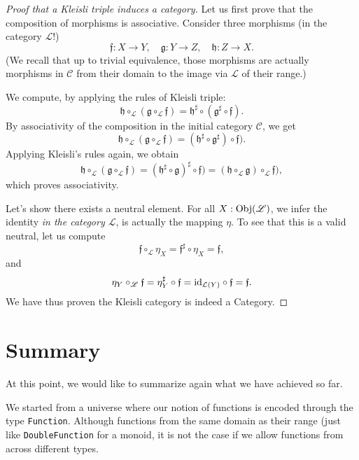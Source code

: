 \documentclass[12pt,a4paper]{report}
\theoremstyle{theorem}
\theoremstyle{definition}
\begin{document}
\begin{proof}[Proof that a Kleisli triple induces a category]
Let us first prove that the composition of morphisms is associative.
Consider three morphisms (in the category $\mathscr{L}$!)
	\[ \mathfrak{f} : X\to Y,
		\quad \mathfrak{g} : Y\to Z,
		\quad \mathfrak{h} : Z\to X .\]
(We recall that up to trivial equivalence, those morphisms are actually
morphisms in $\mathcal{C}$ from their domain to the image via $\mathcal{L}$
of their range.)

We compute, by applying the rules of Kleisli triple:
	\[ \mathfrak{h}\circ_{\mathscr{L}}
		(\mathfrak{g}\circ_{\mathscr{L}} \mathfrak{f})
	= \mathfrak{h}^\sharp \circ (\mathfrak{g}^\sharp \circ \mathfrak{f}) .\]
By associativity of the composition in the initial category $\mathcal{C}$,
we get
	\[ \mathfrak{h}\circ_{\mathscr{L}}
		(\mathfrak{g}\circ_{\mathscr{L}} \mathfrak{f})
	= (\mathfrak{h}^\sharp \circ \mathfrak{g}^\sharp) \circ \mathfrak{f}) .\]
Applying Kleisli's rules again, we obtain
	\[ \mathfrak{h}\circ_{\mathscr{L}}
		(\mathfrak{g}\circ_{\mathscr{L}} \mathfrak{f})
	= (\mathfrak{h}^\sharp \circ \mathfrak{g})^\sharp \circ \mathfrak{f})
	= (\mathfrak{h} \circ_{\mathscr{L}} \mathfrak{g}) \circ_{\mathscr{L}} \mathfrak{f}) ,\]
which proves associativity.

Let's show there exists a neutral element.
For all $X:{\rm Obj}(\mathscr{L})$, we infer the identity
\emph{in the category $\mathscr{L}$}, is actually the mapping $\eta$.
To see that this is a valid neutral, let us compute
	\[ \mathfrak{f}\circ_{\mathscr{L}} \eta_X
		= \mathfrak{f}^\sharp\circ\eta_X = \mathfrak{f} ,\]
and
	\[ \eta_Y \circ_{\mathscr{L}} \mathfrak{f}
		= \eta_Y^\sharp\circ \mathfrak{f}
		= {\rm id}_{\mathcal{L}(Y)}\circ\mathfrak{f} = \mathfrak{f} .\]
We have thus proven the Kleisli category is indeed a Category.
\end{proof}

\section{Summary}

At this point, we would like to summarize again what we have achieved so far.

We started from a universe where our notion of functions
is encoded through the type \lstinline{Function}{}. Although functions
from the same domain as their range (just like \lstinline{DoubleFunction}{}
for a monoid, it is not the case if we allow functions from
across different types.
\end{document}
